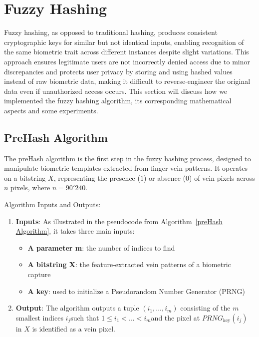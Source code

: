 


\section{Fuzzy Hashing}
\label{sec:Fuzzy Hashing}
Fuzzy hashing, as opposed to traditional hashing, produces consistent cryptographic keys for similar but not identical inputs, enabling recognition of the same biometric trait across different instances despite slight variations. This approach ensures legitimate users are not incorrectly denied access due to minor discrepancies and protects user privacy by storing and using hashed values instead of raw biometric data, making it difficult to reverse-engineer the original data even if unauthorized access occurs. 
This section will discuss how we implemented the fuzzy hashing algorithm, its corresponding mathematical aspects and some experiments.

\subsection{PreHash Algorithm}

The preHash algorithm is the first step in the fuzzy hashing process, designed to manipulate biometric templates extracted from finger vein patterns. It operates on a bitstring \(X\), representing the presence (\(1\)) or absence (\(0\)) of vein pixels across \(n\) pixels, where \(n=90'240\).

Algorithm Inputs and Outputs:
\begin{enumerate}
    \item \textbf{Inputs}: As illustrated in the pseudocode from Algorithm~\ref{preHash Algorithm}, it takes three main inputs:
    \begin{itemize}
        \item \textbf{A parameter m}: the number of indices to find
        \item \textbf{A bitstring X}: the feature-extracted vein patterns of a biometric capture
        \item \textbf{A key}: used to initialize a Pseudorandom Number Generator (PRNG)
    \end{itemize}
    \item \textbf{Output}: The algorithm outputs a tuple \((i_1,...,i_m)\) consisting of the \(m\) smallest indices \(i_j\)​ such that \(1 \leq i_1<...<i_m\)​ and the pixel at \(PRNG_{\text{key}}(i_j)\) in \(X\) is identified as a vein pixel. 
\end{enumerate}

